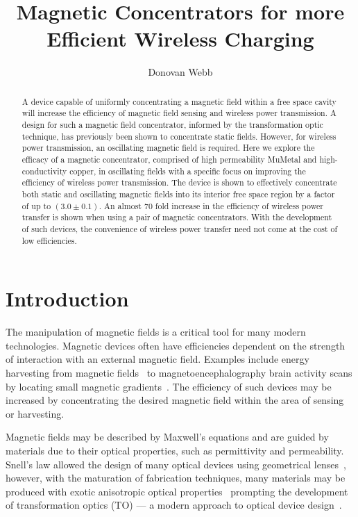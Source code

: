 \documentclass[11pt]{iopart}
\begin{document}
\title[]{Magnetic Concentrators for more Efficient Wireless Charging}

\author{Donovan Webb}

\address{Department of Physics,
University of Bath, Bath BA2 7AY, United Kingdom}

\begin{abstract}
A device capable of uniformly concentrating a magnetic field within a
free space cavity will increase the efficiency of magnetic field
sensing and wireless power transmission.
A design for such a magnetic field concentrator, informed by the
transformation optic technique, has previously been shown to
concentrate static fields.
However, for wireless power transmission, an oscillating magnetic
field is required.
Here we explore the efficacy of a magnetic concentrator, comprised of
high permeability MuMetal and high-conductivity copper, in oscillating fields with a specific focus on
improving the efficiency of wireless power transmission.
The device is shown to effectively concentrate both static and
oscillating magnetic fields into its interior free space region by a
factor of up to $(3.0\pm0.1)$. An almost $70$ fold increase in the
efficiency of wireless power transfer is shown when using a pair of magnetic
concentrators.
With the development of such devices, the convenience of wireless
power transfer need not come at the cost of low efficiencies.

\end{abstract}
\section{Introduction}
The manipulation of magnetic fields is a critical tool for many modern
technologies. Magnetic devices often have efficiencies dependent on
the strength of interaction with an external magnetic field. Examples
include energy harvesting from magnetic fields~\cite{Hirai2000} to
magnetoencephalography brain activity scans by locating small magnetic
gradients~\cite{Cohen1968}. The efficiency of such devices may be increased by
concentrating the desired magnetic field within the area of sensing or
harvesting. 

Magnetic fields may be described by Maxwell's
equations and are guided by materials due to their
optical properties, such as permittivity and permeability. Snell's law
allowed the design of many optical devices
using geometrical lenses~\cite{Pendry2012}, however, with the maturation
of fabrication techniques, many materials may be produced with exotic
anisotropic optical properties~\cite{Smith2004} prompting the development
of transformation optics (TO) --- a modern approach to optical device
design~\cite{Pendry2006}.
\end{document}

